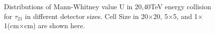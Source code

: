 \documentclass[final,1p,11pt]{elsarticle}
\begin{document}
\begin{figure}
\begin{center}
{   }

\end{center}
\caption{Distributions of Mann-Whitney value U in 20,40TeV energy collision for $\tau_{21}$ in different detector sizes. Cell Size in 20$\times$20, 5$\times$5, and 1$\times$1(cm$\times$cm) are shown here.}
\label{fig:cluster_tau21_tau32}
\end{figure}
\end{document}
